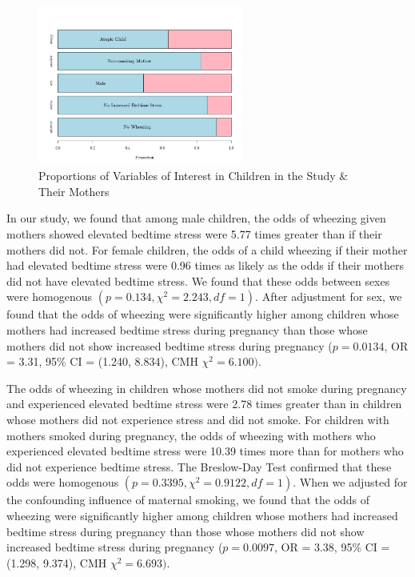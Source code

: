 \documentclass{article}
\begin{document}
	
	
	\newpage
	\begin{figure}[h!]
		\centering
		\includegraphics[width=0.6\textwidth]{graphs/stackedBars_case1.png}
		\caption{Proportions of Variables of Interest in Children in the Study \& Their Mothers}
		\label{fig:histogram}
	\end{figure}

	In our study, we found that among male children, the odds of wheezing given mothers showed elevated bedtime stress were 5.77 times greater than if their mothers did not. For female children, the odds of a child wheezing if their mother had elevated bedtime stress were 0.96 times as likely as the odds if their mothers did not have elevated bedtime stress. We found that these odds between sexes were homogenous $(p = 0.134, \chi^2 = 2.243, df = 1)$. After adjustment for sex, we found that the odds of wheezing were significantly higher among children whose mothers had increased bedtime stress during pregnancy than those whose mothers did not show increased bedtime stress during pregnancy ($p = 0.0134$, OR = 3.31, 95\% CI = (1.240, 8.834), CMH $\chi^2 = 6.100)$.


	The odds of wheezing in children whose mothers did not smoke during pregnancy and experienced elevated bedtime stress were 2.78 times greater than in children whose mothers did not experience stress and did not smoke. For children with mothers smoked during pregnancy, the odds of wheezing with mothers who experienced elevated bedtime stress were 10.39 times more than for mothers who did not experience bedtime stress. The Breslow-Day Test confirmed that these odds were homogenous $(p = 0.3395, \chi^2 = 0.9122, df = 1)$. When we adjusted for the confounding influence of maternal smoking, we found that the odds of wheezing were significantly higher among children whose mothers had increased bedtime stress during pregnancy than those whose mothers did not show increased bedtime stress during pregnancy ($p=0.0097$, OR = 3.38, 95\% CI = (1.298, 9.374), CMH $\chi^2 = 6.693)$.
\end{document}
